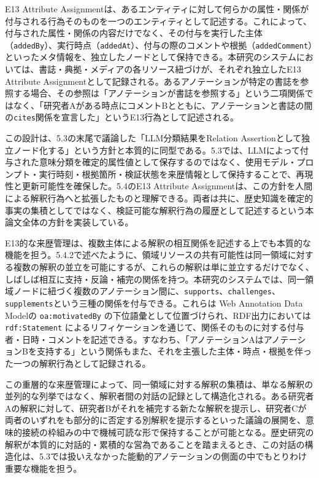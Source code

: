 E13 Attribute Assignmentは、あるエンティティに対して何らかの属性・関係が付与される行為そのものを一つのエンティティとして記述する。これによって、付与された属性・関係の内容だけでなく、その付与を実行した主体（\texttt{addedBy}）、実行時点（\texttt{addedAt}）、付与の際のコメントや根拠（\texttt{addedComment}）といったメタ情報を、独立したノードとして保持できる。本研究のシステムにおいては、書誌・典拠・メディアの各リソース紐づけが、それぞれ独立したE13 Attribute Assignmentとして記録される。あるアノテーションが特定の書誌を参照する場合、その参照は「アノテーションが書誌を参照する」という二項関係ではなく、「研究者Aがある時点にコメントBとともに、アノテーションと書誌の間の\texttt{cites}関係を宣言した」というE13行為として記述される。

この設計は、5.3の末尾で議論した「LLM分類結果をRelation Assertionとして独立ノード化する」という方針と本質的に同型である。5.3では、LLMによって付与された意味分類を確定的属性値として保存するのではなく、使用モデル・プロンプト・実行時刻・根拠箇所・検証状態を来歴情報として保持することで、再現性と更新可能性を確保した。5.4のE13 Attribute Assignmentは、この方針を人間による解釈行為へと拡張したものと理解できる。両者は共に、歴史知識を確定的事実の集積としてではなく、検証可能な解釈行為の履歴として記述するという本論文全体の方針を実装している。

E13的な来歴管理は、複数主体による解釈の相互関係を記述する上でも本質的な機能を担う。5.4.2で述べたように、領域リソースの共有可能性は同一領域に対する複数の解釈の並立を可能にするが、これらの解釈は単に並立するだけでなく、しばしば相互に支持・反論・補完の関係を持つ。本研究のシステムでは、同一領域ノードに紐づく複数のアノテーション間に、\texttt{supports}、\texttt{challenges}、\texttt{supplements}という三種の関係を付与できる。これらは Web Annotation Data Modelの \texttt{oa:motivatedBy} の下位語彙として位置づけられ、RDF出力においては \texttt{rdf:Statement} によるリフィケーションを通じて、関係そのものに対する付与者・日時・コメントを記述できる。すなわち、「アノテーションAはアノテーションBを支持する」という関係もまた、それを主張した主体・時点・根拠を伴った一つの解釈行為として記録される。

この重層的な来歴管理によって、同一領域に対する解釈の集積は、単なる解釈の並列的な列挙ではなく、解釈者間の対話の記録として構造化される。ある研究者Aの解釈に対して、研究者Bがそれを補完する新たな解釈を提示し、研究者Cが両者のいずれをも部分的に否定する別解釈を提示するといった議論の展開を、意味的接続の枠組みの中で機械可読な形で保持することが可能となる。歴史研究の解釈が本質的に対話的・累積的な営為であることを踏まえるとき、この対話の構造化は、5.3では扱いえなかった能動的アノテーションの側面の中でもとりわけ重要な機能を担う。

